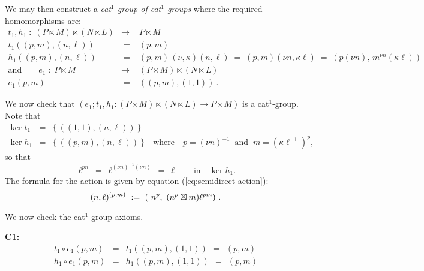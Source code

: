\bigskip\noindent
We may then construct a \emph{cat$^1$-group of cat$^1$-groups}
where the required homomorphisms are:
\begin{eqnarray} 
\label{eq:cat2-th} 
t_1,h_1 \;:\; 
(P \ltimes M) \ltimes (N \ltimes L)
  & \to & P \ltimes M \\
\nonumber
t_1((p,m),(n,\ell))
  & \;=\; & (p,m) \\
\nonumber
h_1((p,m),(n,\ell))
  & \;=\; & (p,m)\,(\nu,\kappa)(n,\ell) \;=\; (p,m)(\nu n,\kappa\ell)
              \;=\;  (p(\nu n),\,m^{\nu n}(\kappa\ell)) \\
\label{eq:cat2-e}
\mbox{and} \quad\quad e_1 \;:\; P \ltimes M
  & \to &  (P \ltimes M) 
            \ltimes (N \ltimes L) \\
\nonumber
e_1(p,m)
  & \;=\; & ((p,m),(1,1))\ .
\end{eqnarray}

\bigskip
We now check that
$(e_1;t_1,h_1 : (P \ltimes M) \ltimes (N \ltimes L) \to P \ltimes M )$
is a cat$^1$-group.
Note that
\begin{eqnarray*}
\ker t_1  & = & 
\{~((1,1),(n,\ell))~\}   \\
\ker h_1  & = &
\{~((p,m),(n,\ell))~\}  \quad\mbox{where}\quad
p = (\nu n)^{-1}       \;\;\mbox{and}\;\;
m = (\kappa\ell^{-1})^p,
\end{eqnarray*}
so that
$$
\ell^{pn} ~=~ \ell^{(\nu n)^{-1}(\nu n)} ~=~ \ell
\qquad\mbox{in}\quad \ker h_1.
$$
The formula for the action is given by equation (\ref{eq:semidirect-action}): 
$$
(n,\ell)^{(p,m)} ~:=~ (~n^p,\ (n^p \boxtimes m)\ell^{pm})\ .
$$

\medskip\noindent
We now check the cat$^1$-group axioms.

\medskip\noindent
\textbf{C1:}
\vspace{-8mm}
\begin{eqnarray*}
t_1 \circ e_1(p,m)
   & = & t_1((p,m),(1,1)) ~~ = ~~ (p,m) \\
h_1 \circ e_1(p,m) 
   & = & h_1((p,m),(1,1)) ~~ = ~~ (p,m) \\
\end{eqnarray*}

